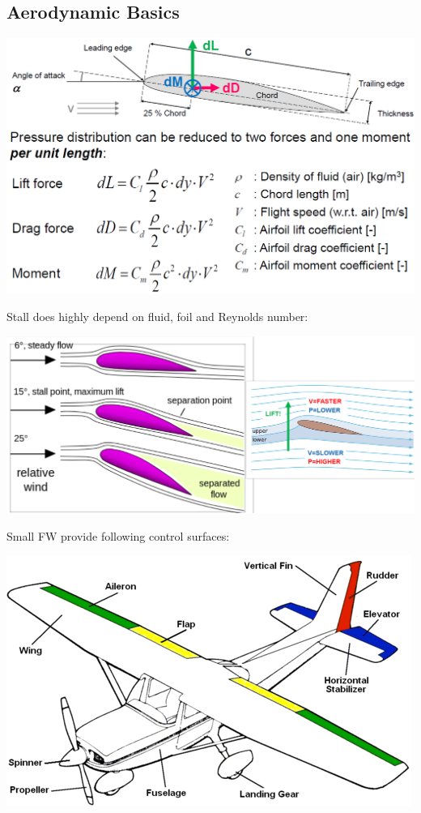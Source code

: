 \documentclass[a4paper, 8pt]{extarticle}
\begin{document}
\begin{multicols*}{3}
\subsection{Aerodynamic Basics}
\begin{center}
    \includegraphics[width=1\linewidth, frame]{images/UAV_Airfoil.PNG}
\end{center}
Stall does highly depend on fluid, foil and Reynolds number:
\begin{center}
    \includegraphics[width=1\linewidth]{images/FW_Stall.png}
\end{center}
Small FW provide following control surfaces:
\begin{center}
    \includegraphics[width=0.7\linewidth]{images/FW_Control.png}
\end{center}





\end{multicols*}
\end{document}

